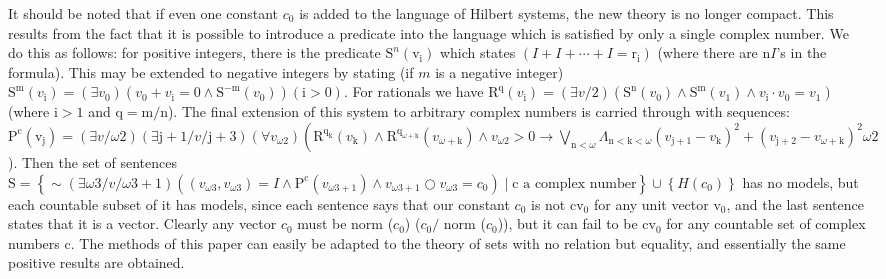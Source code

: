 \documentclass{article}
\begin{document}
{{{It should be noted that if even one constant $c_{0}$ is added to the language of Hilbert systems, the new theory is no longer compact. This results from the fact that it is possible to introduce a predicate into the language which is satisfied by only a single complex number. We do this as follows: for positive integers, there is the predicate $\mathrm{S}^{n}\left(\mathrm{v}_{\mathrm{i}}\right)$ which states $\left(I+I+\cdots+I=\mathrm{r}_{\mathrm{i}}\right)$ (where there are $\mathrm{n} I$'s in the formula). This may be extended to negative integers by stating (if $m$ is a negative integer) $\mathrm{S}^{\mathrm{m}}\left(v_{\mathrm{i}}\right)=\left(\exists v_{0}\right)\left(v_{0}+v_{\mathrm{i}}=0 \wedge \mathrm{S}^{-\mathrm{m}}\left(v_{0}\right)\right)(\mathrm{i}>0)$. For rationals we have $\mathrm{R}^{\mathrm{q}}\left(v_{\mathrm{i}}\right)=(\exists v / 2)\left(\mathrm{S}^{\mathrm{n}}\left(v_{0}\right) \wedge \mathrm{S}^{\mathrm{m}}\left(v_{1}\right) \wedge v_{\mathrm{i}} \cdot v_{0}=v_{1}\right)$ (where $\mathrm{i}>1$ and $\mathrm{q}=\mathrm{m} / \mathrm{n}$). The final extension of this system to arbitrary complex numbers is carried through with sequences: $\mathrm{P}^{\mathrm{c}}\left(\mathrm{v}_{\mathrm{j}}\right)=(\exists v / \omega 2)(\exists \mathrm{j}+1 / v / \mathrm{j}+3)\left(\forall v_{\omega 2}\right)\left(\mathrm{R}^{\mathrm{q}_{\mathrm{k}}}\left(v_{\mathrm{k}}\right) \wedge \mathrm{R}^{\mathrm{q}_{\omega+\mathrm{k}}}\left(v_{\omega+\mathrm{k}}\right) \wedge v_{\omega 2}>0 \rightarrow \bigvee_{\mathrm{n}<\omega} \Lambda_{\mathrm{n}<\mathrm{k}<\omega}\left(v_{\mathrm{j}+1}-v_{\mathrm{k}}\right)^{2}+\left(v_{\mathrm{j}+2}-v_{\omega+\mathrm{k}}\right)^{2}\omega 2$). Then the set of sentences $\mathrm{S}=\left\{\sim(\exists \omega 3 / v / \omega 3+1)\left(\left(v_{\omega 3}, v_{\omega 3}\right)=I \wedge \mathrm{P}^{\mathrm{c}}\left(v_{\omega 3+1}\right) \wedge v_{\omega 3+1} \bigcirc v_{\omega 3}=c_{0}\right) \mid \mathrm{c} \text{ a complex number}\right\} \cup \left\{H\left(c_{0}\right)\right\}$ has no models, but each countable subset of it has models, since each sentence says that our constant $c_{0}$ is not $\mathrm{cv}_{0}$ for any unit vector $\mathrm{v}_{0}$, and the last sentence states that it is a vector. Clearly any vector $c_{0}$ must be norm ($c_{0}$) ($c_{0} /$ norm ($c_{0}$)), but it can fail to be $\mathrm{cv}_{0}$ for any countable set of complex numbers c.
The methods of this paper can easily be adapted to the theory of sets with no relation but equality, and essentially the same positive results are obtained.
\begin{thebibliography}{9}

\end{thebibliography}}}}
\end{document}
